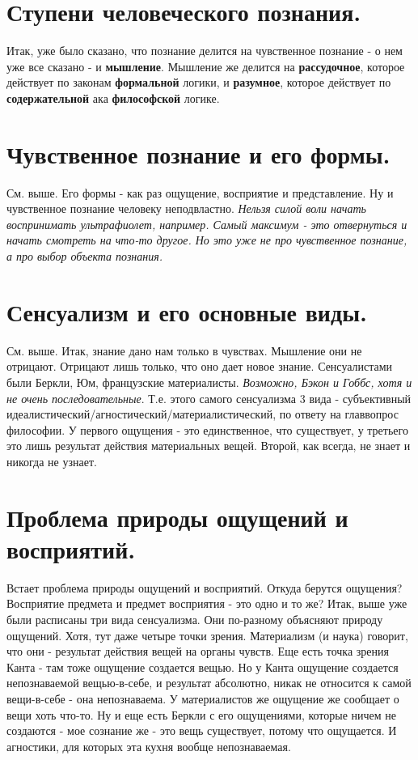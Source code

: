 \section{ Ступени человеческого познания.}
Итак, уже было сказано, что познание делится на чувственное познание - о нем уже все сказано - и \textbf{мышление}. Мышление же делится на \textbf{рассудочное}, которое действует по законам \textbf{формальной} логики, и \textbf{разумное}, которое действует по \textbf{содержательной} ака \textbf{философской} логике.

\section{ Чувственное познание и его формы.}
См. выше. Его формы - как раз ощущение, восприятие и представление. Ну и чувственное познание человеку неподвластно. \textit{Нельзя силой воли начать воспринимать ультрафиолет, например. Самый максимум - это отвернуться и начать смотреть на что-то другое. Но это уже не про чувственное познание, а про выбор объекта познания.}

\section{ Сенсуализм и его основные виды.}
См. выше. Итак, знание дано нам только в чувствах. Мышление они не отрицают. Отрицают лишь только, что оно дает новое знание. Сенсуалистами были Беркли, Юм, французские материалисты. \textit{Возможно, Бэкон и Гоббс, хотя и не очень последовательные}. Т.е. этого самого сенсуализма 3 вида - субъективный идеалистический/агностический/материалистический, по ответу на главвопрос философии. У первого ощущения - это единственное, что существует, у третьего это лишь результат действия материальных вещей. Второй, как всегда, не знает и никогда не узнает.

\section{ Проблема природы ощущений и восприятий.}
Встает проблема природы ощущений и восприятий. Откуда берутся ощущения? Восприятие предмета и предмет восприятия - это одно и то же? Итак, выше уже были расписаны три вида сенсуализма. Они по-разному объясняют природу ощущений. Хотя, тут даже четыре точки зрения. Материализм (и наука) говорит, что они - результат действия вещей на органы чувств. Еще есть точка зрения Канта - там тоже ощущение создается вещью. Но у Канта ощущение создается непознаваемой вещью-в-себе, и результат абсолютно, никак не относится к самой вещи-в-себе - она непознаваема. У материалистов же ощущение же сообщает о вещи хоть что-то. Ну и еще есть Беркли с его ощущениями, которые ничем не создаются - мое сознание же - это вещь существует, потому что ощущается. И агностики, для которых эта кухня вообще непознаваемая.

